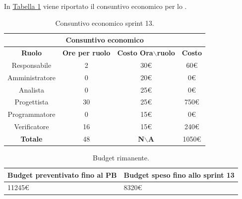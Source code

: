 In \hyperref[tab:sprint13_consuntivo_economico]{Tabella \ref{tab:sprint13_consuntivo_economico}} viene riportato il consuntivo economico per lo .
\begin{table}[H]
    \centering
    \begin{tabular}{|c|c|c|c|}
        \hline
            \multicolumn{4}{|c|}{\textbf{Consuntivo economico}} \\ 
        \hline
            \textbf{Ruolo} & \textbf{Ore per ruolo} & \textbf{Costo Ora$\backslash$ruolo} & \textbf{Costo} \\
        \hline
        Responsabile & 2 & 30€ & 60€ \\
        \hline
        Amministratore & 0 & 20€ & 0€ \\
        \hline
        Analista & 0 & 25€ & 0€ \\
        \hline
        Progettista & 30 & 25€ & 750€ \\
        \hline
        Programmatore & 0 & 15€ & 0€ \\
        \hline
        Verificatore & 16 & 15€ & 240€ \\
        \hline 
        \textbf{Totale} & 48 & \textbf{N$\backslash$A} & 1050€  \\
        \hline
    \end{tabular}
    \caption{Consuntivo economico sprint 13.}
    \label{tab:sprint13_consuntivo_economico}
\end{table}

\begin{table}[H]
    \centering
    \begin{tabular}{| l | l |}
    \hline
    \textbf{Budget preventivato fino al PB} & \textbf{Budget speso fino allo sprint 13}\\
    \hline
        11245€ & 8320€ \\
    \hline
    \end{tabular}
    \caption{Budget rimanente.}
    \label{tab:budget_rimanente_sprint13}
\end{table}